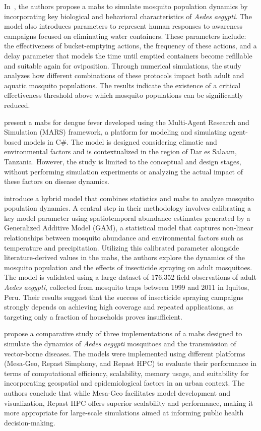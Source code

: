 In~\cite{Gramajo2022}, the authors propose a \gls{mabs} to simulate mosquito
population dynamics by incorporating key biological and behavioral
characteristics of \textit{Aedes aegypti}. The model also introduces parameters to
represent human responses to awareness campaigns focused on eliminating water
containers. These parameters include: the effectiveness of bucket-emptying
actions, the frequency of these actions, and a delay parameter that models the
time until emptied containers become refillable and suitable again for
oviposition. Through numerical simulations, the study analyzes how different
combinations of these protocols impact both adult and aquatic mosquito
populations. The results indicate the existence of a critical effectiveness
threshold above which mosquito populations can be significantly reduced.

\cite{Pascoe2023} present a \gls{mabs} for dengue fever developed using the
Multi-Agent Research and Simulation (MARS) framework, a platform for modeling
and simulating agent-based models in C\#. The model is designed considering
climatic and environmental factors and is contextualized in the region of Dar es
Salaam, Tanzania. However, the study is limited to the conceptual and design
stages, without performing simulation experiments or analyzing the actual impact
of these factors on disease dynamics.

\cite{Cavany2023} introduce a hybrid model that combines statistics and
\gls{mabs} to analyze mosquito population dynamics. A central step in their
methodology involves calibrating a key model parameter using spatiotemporal
abundance estimates generated by a Generalized Additive Model (GAM), a
statistical model that captures non-linear relationships between mosquito
abundance and environmental factors such as temperature and precipitation.
Utilizing this calibrated parameter alongside literature-derived values in the
\gls{mabs}, the authors explore the dynamics of the mosquito population and the
effects of insecticide spraying on adult mosquitoes. The model is validated
using a large dataset of 176.352 field observations of adult \textit{Aedes
	aegypti}, collected from mosquito traps between 1999 and 2011 in Iquitos, Peru.
Their results suggest that the success of insecticide spraying campaigns
strongly depends on achieving high coverage and repeated applications, as
targeting only a fraction of households proves insufficient.


\cite{Uribe2023} propose a comparative study of three implementations of a
\gls{mabs} designed to simulate the dynamics of \textit{Aedes aegypti}
mosquitoes and the transmission of vector-borne diseases. The models were
implemented using different platforms (Mesa-Geo, Repast Simphony, and Repast
HPC) to evaluate their performance in terms of computational efficiency,
scalability, memory usage, and suitability for incorporating geospatial and
epidemiological factors in an urban context. The authors conclude that while
Mesa-Geo facilitates model development and visualization, Repast HPC offers
superior scalability and performance, making it more appropriate for large-scale
simulations aimed at informing public health decision-making.


